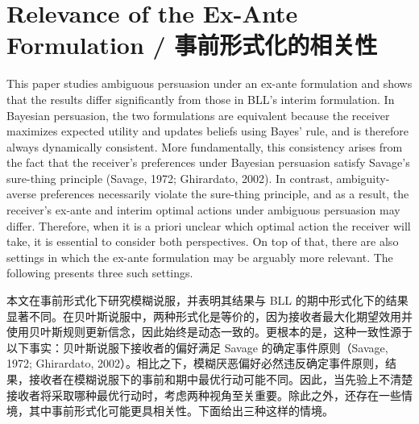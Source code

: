 \documentclass[12pt,a4paper]{article}
\theoremstyle{definition}
\theoremstyle{remark}
\newenvironment{original}{%
    \par\medskip\noindent%
    \begin{tcolorbox}[%
        colback=white,%
        colframe=black!50,%
        title=\textbf{Original English},%
        fonttitle=\small\bfseries,%
        left=0pt, right=0pt, top=2pt, bottom=2pt,%
        boxrule=0.5pt,%
        arc=0pt,%
        outer arc=0pt%
    ]%
    \small%
}{%
    \end{tcolorbox}%
}
\newenvironment{translation}{%
    \par\smallskip\noindent%
    \begin{tcolorbox}[%
        colback=blue!3!white,%
        colframe=blue!40!black,%
        title=\textbf{中文翻译},%
        fonttitle=\small\bfseries,%
        left=0pt, right=0pt, top=2pt, bottom=2pt,%
        boxrule=0.5pt,%
        arc=0pt,%
        outer arc=0pt%
    ]%
    \small\color{blue!60!black}%
}{%
    \end{tcolorbox}\medskip%
}
\begin{document}
\section{Relevance of the Ex-Ante Formulation / 事前形式化的相关性}

\begin{original}
This paper studies ambiguous persuasion under an ex-ante formulation and shows that the results differ significantly from those in BLL's interim formulation. In Bayesian persuasion, the two formulations are equivalent because the receiver maximizes expected utility and updates beliefs using Bayes' rule, and is therefore always dynamically consistent. More fundamentally, this consistency arises from the fact that the receiver's preferences under Bayesian persuasion satisfy Savage's sure-thing principle (Savage, 1972; Ghirardato, 2002). In contrast, ambiguity-averse preferences necessarily violate the sure-thing principle, and as a result, the receiver's ex-ante and interim optimal actions under ambiguous persuasion may differ. Therefore, when it is a priori unclear which optimal action the receiver will take, it is essential to consider both perspectives. On top of that, there are also settings in which the ex-ante formulation may be arguably more relevant. The following presents three such settings.
\end{original}
\begin{translation}
本文在事前形式化下研究模糊说服，并表明其结果与 BLL 的期中形式化下的结果显著不同。在贝叶斯说服中，两种形式化是等价的，因为接收者最大化期望效用并使用贝叶斯规则更新信念，因此始终是动态一致的。更根本的是，这种一致性源于以下事实：贝叶斯说服下接收者的偏好满足 Savage 的确定事件原则（Savage, 1972; Ghirardato, 2002）。相比之下，模糊厌恶偏好必然违反确定事件原则，结果，接收者在模糊说服下的事前和期中最优行动可能不同。因此，当先验上不清楚接收者将采取哪种最优行动时，考虑两种视角至关重要。除此之外，还存在一些情境，其中事前形式化可能更具相关性。下面给出三种这样的情境。
\end{translation}
\end{document}

